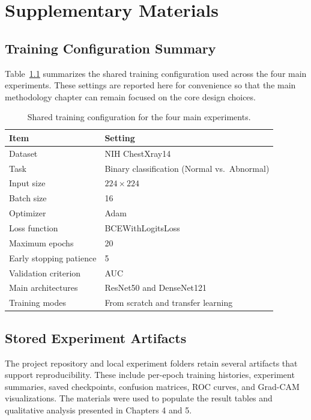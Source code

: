 \chapter{Supplementary Materials}

\section{Training Configuration Summary}
Table~\ref{tab:appendix-training-config} summarizes the shared training configuration used across the four main experiments. These settings are reported here for convenience so that the main methodology chapter can remain focused on the core design choices.

\begin{table}[H]
    \centering
    \caption{Shared training configuration for the four main experiments.}
    \label{tab:appendix-training-config}
    \begin{tabular}{ll}
        \toprule
        Item & Setting \\
        \midrule
        Dataset & NIH ChestXray14 \\
        Task & Binary classification (Normal vs.\ Abnormal) \\
        Input size & $224 \times 224$ \\
        Batch size & 16 \\
        Optimizer & Adam \\
        Loss function & BCEWithLogitsLoss \\
        Maximum epochs & 20 \\
        Early stopping patience & 5 \\
        Validation criterion & AUC \\
        Main architectures & ResNet50 and DenseNet121 \\
        Training modes & From scratch and transfer learning \\
        \bottomrule
    \end{tabular}
\end{table}

\section{Stored Experiment Artifacts}
The project repository and local experiment folders retain several artifacts that support reproducibility. These include per-epoch training histories, experiment summaries, saved checkpoints, confusion matrices, ROC curves, and Grad-CAM visualizations. The materials were used to populate the result tables and qualitative analysis presented in Chapters 4 and 5.

